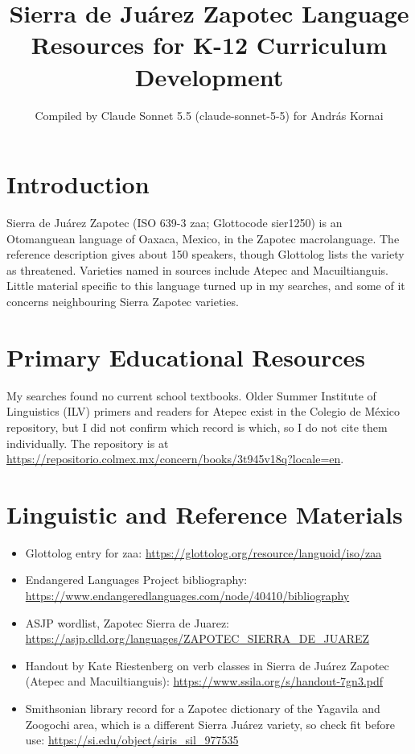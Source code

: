 \documentclass[12pt]{article}
\title{Sierra de Ju\'arez Zapotec Language Resources for K-12 Curriculum Development}
\author{Compiled by Claude Sonnet 5.5 (claude-sonnet-5-5) for Andr\'as Kornai}
\date{}
\begin{document}
\maketitle

\section{Introduction}
Sierra de Ju\'arez Zapotec (ISO 639-3 zaa; Glottocode sier1250) is an Otomanguean language of Oaxaca, Mexico, in the Zapotec macrolanguage. The reference description gives about 150 speakers, though Glottolog lists the variety as threatened. Varieties named in sources include Atepec and Macuiltianguis. Little material specific to this language turned up in my searches, and some of it concerns neighbouring Sierra Zapotec varieties.

\section{Primary Educational Resources}
My searches found no current school textbooks. Older Summer Institute of Linguistics (ILV) primers and readers for Atepec exist in the Colegio de M\'exico repository, but I did not confirm which record is which, so I do not cite them individually. The repository is at \url{https://repositorio.colmex.mx/concern/books/3t945v18q?locale=en}.

\section{Linguistic and Reference Materials}
\begin{itemize}
\item Glottolog entry for zaa: \url{https://glottolog.org/resource/languoid/iso/zaa}
\item Endangered Languages Project bibliography: \url{https://www.endangeredlanguages.com/node/40410/bibliography}
\item ASJP wordlist, Zapotec Sierra de Juarez: \url{https://asjp.clld.org/languages/ZAPOTEC_SIERRA_DE_JUAREZ}
\item Handout by Kate Riestenberg on verb classes in Sierra de Ju\'arez Zapotec (Atepec and Macuiltianguis): \url{https://www.ssila.org/s/handout-7gn3.pdf}
\item Smithsonian library record for a Zapotec dictionary of the Yagavila and Zoogochi area, which is a different Sierra Ju\'arez variety, so check fit before use: \url{https://si.edu/object/siris_sil_977535}
\end{itemize}
\end{document}
